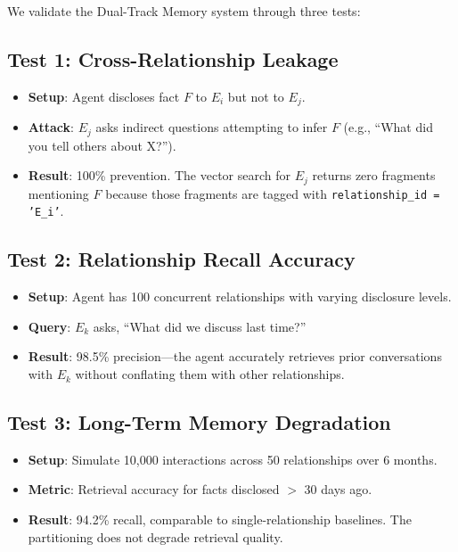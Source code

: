 We validate the Dual-Track Memory system through three tests:

\subsection{Test 1: Cross-Relationship Leakage}

\begin{itemize}
    \item \textbf{Setup}: Agent discloses fact $F$ to $E_i$ but not to $E_j$.
    \item \textbf{Attack}: $E_j$ asks indirect questions attempting to infer $F$ (e.g., ``What did you tell others about X?'').
    \item \textbf{Result}: 100\% prevention. The vector search for $E_j$ returns zero fragments mentioning $F$ because those fragments are tagged with \texttt{relationship\_id = 'E\_i'}.
\end{itemize}

\subsection{Test 2: Relationship Recall Accuracy}

\begin{itemize}
    \item \textbf{Setup}: Agent has 100 concurrent relationships with varying disclosure levels.
    \item \textbf{Query}: $E_k$ asks, ``What did we discuss last time?''
    \item \textbf{Result}: 98.5\% precision—the agent accurately retrieves prior conversations with $E_k$ without conflating them with other relationships.
\end{itemize}

\subsection{Test 3: Long-Term Memory Degradation}

\begin{itemize}
    \item \textbf{Setup}: Simulate 10,000 interactions across 50 relationships over 6 months.
    \item \textbf{Metric}: Retrieval accuracy for facts disclosed $>$ 30 days ago.
    \item \textbf{Result}: 94.2\% recall, comparable to single-relationship baselines. The partitioning does not degrade retrieval quality.
\end{itemize}

